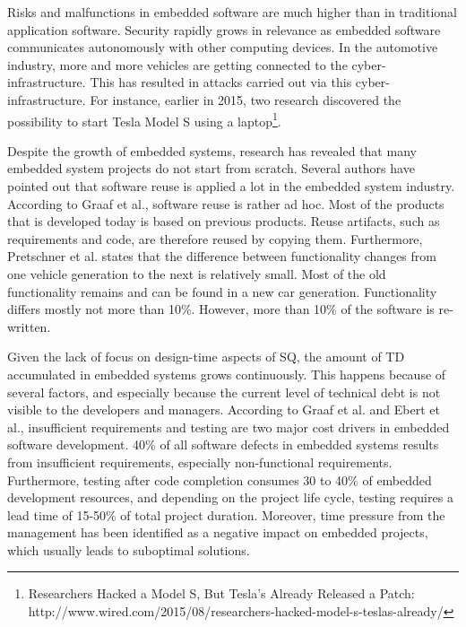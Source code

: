 

Risks and malfunctions in embedded software are much higher than in traditional application software. Security rapidly grows in relevance as embedded software communicates autonomously with other computing devices\cite{ebert2009embedded}. In the automotive industry, more and more vehicles are getting connected to the cyber-infrastructure\cite{pretschner2007software}. This has resulted in attacks carried out via this cyber-infrastructure. For instance, earlier in 2015, two research discovered the possibility to start Tesla Model S using a laptop\footnote{Researchers Hacked a Model S, But Tesla's Already Released a Patch: http://www.wired.com/2015/08/researchers-hacked-model-s-teslas-already/}. 

Despite the growth of embedded systems, research has revealed that many embedded system projects do not start from scratch\cite{graaf2003embedded,pretschner2007software}. Several authors have pointed out that software reuse is applied a lot in the embedded system industry. According to Graaf et al.\cite{graaf2003embedded}, software reuse is rather ad hoc. Most of the products that is developed today is based on previous products. Reuse artifacts, such as requirements and code, are therefore reused by copying them. Furthermore, Pretschner et al.\cite{pretschner2007software} states that the difference between functionality changes from one vehicle generation to the next is relatively small. Most of the old functionality remains and can be found in a new car generation. Functionality differs mostly not more than 10\%. However, more than 10\% of the software is re-written.

Given the lack of focus on design-time aspects of SQ, the amount of TD accumulated in embedded systems grows continuously. This happens because of several factors, and especially because the current level of technical debt is not visible to the developers and managers. According to Graaf et al.\cite{graaf2003embedded} and Ebert et al.\cite{ebert2009embedded}, insufficient requirements and testing are two major cost drivers in embedded software development. 40\% of all software defects in embedded systems results from insufficient requirements, especially non-functional requirements\cite{graaf2003embedded,washizaki2007quality,ebert2009embedded}. Furthermore, testing after code completion consumes 30 to 40\% of embedded development resources, and depending on the project life cycle, testing requires a lead time of 15-50\% of total project duration\cite{ebert2009embedded}. Moreover, time pressure from the management has been identified as a negative impact on embedded projects, which usually leads to suboptimal solutions.

